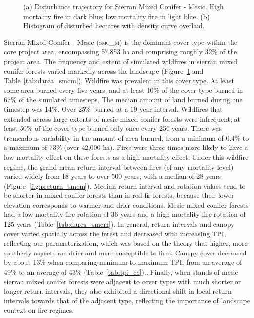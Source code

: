 \begin{figure}[!htbp]
  \centering
  \caption{\small (a) Disturbance trajectory for Sierran Mixed Conifer - Mesic. High mortality fire in dark blue; low mortality fire in light blue. (b) Histogram of disturbed hectares with density curve overlaid.} 
  \label{fig:darea_smcm}
\end{figure}

Sierran Mixed Conifer - Mesic (\textsc{smc\_m}) is the dominant cover type within the core project area, encompassing 57,853 ha and comprising roughly 32\% of the project area. The frequency and extent of simulated wildfires in sierran mixed conifer forests varied markedly across the landscape (Figure~\ref{fig:darea_smcm} and Table~\ref{tab:darea_smcm}). %
%
Wildfire was prevalent in this cover type. At least some area burned every five years, and at least 10\% of the cover type burned in 67\% of the simulated timesteps. The median amount of land burned during one timestep was 14\%. Over 25\% burned at a 19 year interval. Wildfires that extended across large extents of mesic mixed conifer forests were infrequent; at least 50\% of the cover type burned only once every 256 years. There was tremendous variability in the amount of area burned, from a minimum of 0.4\% to a maximum of 73\% (over 42,000 ha). Fires were three times more likely to have a low mortality effect on these forests as a high mortality effect. %
%
Under this wildfire regime, the grand mean return interval between fires (of any mortality level) varied widely from 18 years to over 500 years, with a median of 28 years (Figure~\ref{fig:preturn_smcm}). Median return interval and rotation values tend to be shorter in mixed conifer forests than in red fir forests, because their lower elevation corresponds to warmer and drier conditions. Mesic mixed conifer forests had a low mortality fire rotation of 36 years and a high mortality fire rotation of 125 years (Table~\ref{tab:darea_smcm}).   %
%
In general, return intervals and canopy cover varied spatially across the forest and decreased with increasing TPI, reflecting our parameterization, which was based on the theory that higher, more southerly aspects are drier and more susceptible to fires. Canopy cover decreased by about 13\% when comparing minimum to maximum TPI, from an average of 49\% to an average of 43\% (Table~\ref{tab:tpi_cc})..  %
%
Finally, when stands of mesic sierran mixed conifer forests were adjacent to cover types with much shorter or longer return intervals, they also exhibited a directional shift in local return intervals towards that of the adjacent type, reflecting the importance of landscape context on fire regimes.

